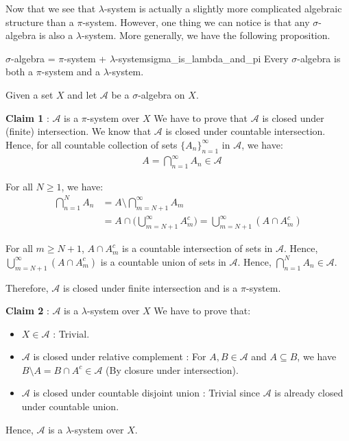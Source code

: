 \noindent Now that we see that $\lambda$-system is actually a slightly more complicated algebraic structure than a $\pi$-system. However, one thing we can notice is that any $\sigma$-algebra is also a $\lambda$-system. More generally, we have the following proposition.

\begin{proposition}{$\sigma$-algebra = $\pi$-system + $\lambda$-system}{sigma_is_lambda_and_pi}
    Every $\sigma$-algebra is both a $\pi$-system and a $\lambda$-system.
\end{proposition}

\begin{proof*}
Given a set $X$ and let $\mathcal{A}$ be a $\sigma$-algebra on $X$. \newline 
\begin{subproof}{\textbf{Claim 1} : $\mathcal{A}$ is a $\pi$-system over $X$}
    We have to prove that $\mathcal{A}$ is closed under (finite) intersection. We know that $\mathcal{A}$ is closed under countable intersection. Hence, for all countable collection of sets $\{A_n\}_{n=1}^\infty$ in $\mathcal{A}$, we have:
    \begin{align*}
        &A = \bigcap_{n=1}^\infty A_n \in \mathcal{A}
    \end{align*}

    \noindent For all $N \ge 1$, we have:
    \begin{align*}
        \bigcap_{n=1}^N A_n &= A \setminus \bigcap_{m=N+1}^\infty A_m \\
            &= A \cap \Bigg( \bigcup_{m=N+1}^{\infty} A_m^c \Bigg) = \bigcup_{m=N+1}^\infty (A \cap A_m^c)
    \end{align*}

    \noindent For all $m \ge N+1$, $A\cap A_m^c$ is a countable intersection of sets in $\mathcal{A}$. Hence, $\bigcup_{m=N+1}^\infty (A \cap A_m^c)$ is a countable union of sets in $\mathcal{A}$. Hence, $\bigcap_{n=1}^N A_n \in \mathcal{A}$.

    \noindent Therefore, $\mathcal{A}$ is closed under finite intersection and is a $\pi$-system.\newline
\end{subproof}


\begin{subproof}{\textbf{Claim 2} : $\mathcal{A}$ is a $\lambda$-system over $X$}
    We have to prove that:
    \begin{itemize}
        \item $X \in \mathcal{A}$ : Trivial.
        \item $\mathcal{A}$ is closed under relative complement : For $A, B \in \mathcal{A}$ and $A\subseteq B$, we have $B\setminus A = B \cap A^c \in \mathcal{A}$ (By closure under intersection).
        \item $\mathcal{A}$ is closed under countable disjoint union : Trivial since $\mathcal{A}$ is already closed under countable union.
    \end{itemize}

    \noindent Hence, $\mathcal{A}$ is a $\lambda$-system over $X$.
\end{subproof}
\end{proof*}

